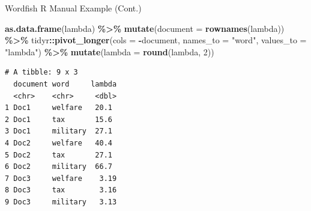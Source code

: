 \documentclass[
  ignorenonframetext,
  aspectratio=169]{beamer}
\newenvironment{Shaded}{\begin{snugshade}}{\end{snugshade}}
\newcommand{\AttributeTok}[1]{\textcolor[rgb]{0.13,0.29,0.53}{#1}}
\newcommand{\DecValTok}[1]{\textcolor[rgb]{0.00,0.00,0.81}{#1}}
\newcommand{\FunctionTok}[1]{\textcolor[rgb]{0.13,0.29,0.53}{\textbf{#1}}}
\newcommand{\NormalTok}[1]{#1}
\newcommand{\SpecialCharTok}[1]{\textcolor[rgb]{0.81,0.36,0.00}{\textbf{#1}}}
\newcommand{\StringTok}[1]{\textcolor[rgb]{0.31,0.60,0.02}{#1}}
\begin{document}
\begin{frame}[fragile]{Wordfish R Manual Example (Cont.)}
\label{wordfish-r-manual-example-cont.}
\scriptsize

\begin{Shaded}
\begin{Highlighting}[]
\FunctionTok{as.data.frame}\NormalTok{(lambda) }\SpecialCharTok{\%\textgreater{}\%}
  \FunctionTok{mutate}\NormalTok{(}\AttributeTok{document =} \FunctionTok{rownames}\NormalTok{(lambda)) }\SpecialCharTok{\%\textgreater{}\%}
\NormalTok{  tidyr}\SpecialCharTok{::}\FunctionTok{pivot\_longer}\NormalTok{(}\AttributeTok{cols =} \SpecialCharTok{{-}}\NormalTok{document,}
               \AttributeTok{names\_to =} \StringTok{"word"}\NormalTok{,}
               \AttributeTok{values\_to =} \StringTok{"lambda"}\NormalTok{) }\SpecialCharTok{\%\textgreater{}\%}
  \FunctionTok{mutate}\NormalTok{(}\AttributeTok{lambda =} \FunctionTok{round}\NormalTok{(lambda, }\DecValTok{2}\NormalTok{))}
\end{Highlighting}
\end{Shaded}

\begin{verbatim}
# A tibble: 9 x 3
  document word     lambda
  <chr>    <chr>     <dbl>
1 Doc1     welfare   20.1 
2 Doc1     tax       15.6 
3 Doc1     military  27.1 
4 Doc2     welfare   40.4 
5 Doc2     tax       27.1 
6 Doc2     military  66.7 
7 Doc3     welfare    3.19
8 Doc3     tax        3.16
9 Doc3     military   3.13
\end{verbatim}
\end{frame}
\end{document}
